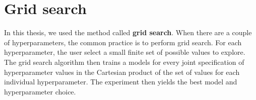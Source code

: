 \section{Grid search}
\label{section-grid-search}

In this thesis, we used the method called \textbf{grid search}\cite{grid-search}. When there are a couple of hyperparameters, the common practice
is to perform grid search. For each hyperparameter, the user select a
small finite set of possible values to explore. The grid search algorithm
then trains a models for every joint specification of hyperparameter
values in the Cartesian product of the set of values for each individual
hyperparameter. The experiment then yields the best model and hyperparameter choice. 




